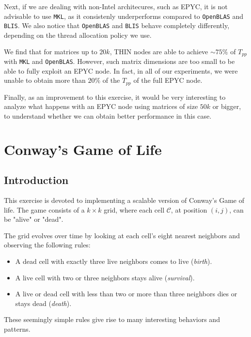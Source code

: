\documentclass{report}
\begin{document}
Next, if we are dealing with non-Intel architecures, such as EPYC, it is not 
advisable to use \texttt{MKL}, as it consistenly underperforms compared to 
\texttt{OpenBLAS} and \texttt{BLIS}. We also notice that \texttt{OpenBLAS} and 
\texttt{BLIS} behave completely differently, depending on the thread allocation
policy we use.

We find that for matrices up to $20k$, THIN nodes are able to achieve 
$\sim 75\%$ of $T_{pp}$ with \texttt{MKL} and \texttt{OpenBLAS}. However, 
such matrix dimensions are too small to be able to fully exploit an EPYC node. 
In fact, in all of our experiments, we were unable to obtain 
more than $20\%$ of the $T_{pp}$ of the full EPYC node.

Finally, as an improvement to this exercise, it would be very interesting to 
analyze what happens with an EPYC node using matrices of size $50k$ or bigger, 
to understand whether we can obtain better performance in this case.

\chapter{Conway's Game of Life}


\section{Introduction}

This exercise is devoted to implementing a scalable version of Conway's Game of 
life\cite{conway}. The game consists of a $k\times k$ grid, where each cell 
$\mathcal{C}$, at position $(i,j)$, can be "alive" or "dead".

The grid evolves over time by looking at each cell's  eight nearest 
neighbors and observing the following rules: 

\begin{itemize}
    \item A dead cell with exactly three live neighbors comes to live (\textit{birth}).
    \item A live cell with two or three neighbors stays alive (\textit{survival}).
    \item A live or dead cell with less than two or more than three neighbors dies 
        or stays dead (\textit{death}).
\end{itemize}

These seemingly simple rules give rise to many interesting behaviors and 
patterns\cite{conway_patterns}. 
\end{document}

